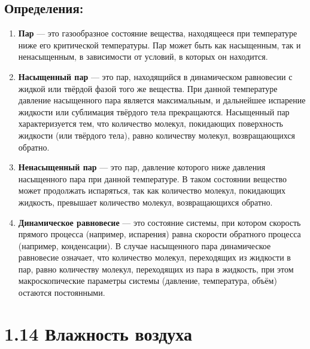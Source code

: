 \documentclass[a4paper,12pt]{article}
\begin{document}
\subsection*{Определения:}
\vspace{-3pt}
\begin{enumerate} [itemsep=0pt, topsep=0pt, parsep=0pt]
    \item \textbf{Пар} --- это газообразное состояние вещества, находящееся при температуре ниже его критической температуры. Пар может быть как насыщенным, так и ненасыщенным, в зависимости от условий, в которых он находится.
    \item \textbf{Насыщенный пар} — это пар, находящийся в динамическом равновесии с жидкой или твёрдой фазой того же вещества. При данной температуре давление насыщенного пара является максимальным, и дальнейшее испарение жидкости или сублимация твёрдого тела прекращаются. Насыщенный пар характеризуется тем, что количество молекул, покидающих поверхность жидкости (или твёрдого тела), равно количеству молекул, возвращающихся обратно.
    \item \textbf{Ненасыщенный пар} — это пар, давление которого ниже давления насыщенного пара при данной температуре. В таком состоянии вещество может продолжать испаряться, так как количество молекул, покидающих жидкость, превышает количество молекул, возвращающихся обратно.
    \item \textbf{Динамическое равновесие} — это состояние системы, при котором скорость прямого процесса (например, испарения) равна скорости обратного процесса (например, конденсации). В случае насыщенного пара динамическое равновесие означает, что количество молекул, переходящих из жидкости в пар, равно количеству молекул, переходящих из пара в жидкость, при этом макроскопические параметры системы (давление, температура, объём) остаются постоянными.
\end{enumerate}


\section*{1.14 Влажность воздуха}
\vspace{-9pt}
\end{document}
